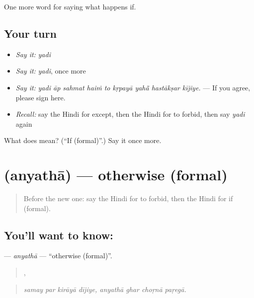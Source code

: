 \begin{grammarlens}[title={What you've built}]
One more word for saying what happens if.
\end{grammarlens}

\subsection*{Your turn}
\begin{itemize}
\raggedright
  \item \emph{Say it:} \emph{yadi}
  \item \emph{Say it:} \emph{yadi}, once more
  \item \emph{Say it:} \emph{yadi āp sahmat haiṁ to kṛpayā yahā̃ hastākṣar kījiye.} — If you agree, please sign here.
  \item \emph{Recall:} say the Hindi for except, then the Hindi for to forbid, then say \emph{yadi} again
\end{itemize}

\begin{tcolorbox}[breakable,colback=teal!4,colframe=teal!35!black,title={Before you move on}]
What does  mean? (\textquotedblleft{}If (formal)\textquotedblright{}.) Say it once more.
\end{tcolorbox}
\section[\texorpdfstring{\hi{अन्यथा} (anyathā)}{अन्यथा (anyathā)}]{ (anyathā) — otherwise (formal)}

\label{lesson:HI-C379-anyatha}



\begin{quote}
Before the new one: say the Hindi for to forbid, then the Hindi for if (formal).
\end{quote}

\subsection*{You'll want to know: }
\textbf{} — \emph{anyathā} — \textquotedblleft{}otherwise (formal)\textquotedblright{}.

\begin{quote}
   ,    
\end{quote}

\begin{quote}
\emph{samay par kirāyā dījiye, anyathā ghar choṛnā paṛegā.}
\end{quote}


